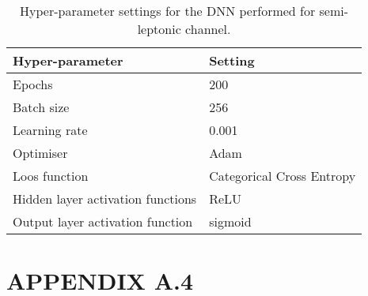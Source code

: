 \begin{table}[h!]
    \centering
    \caption{Hyper-parameter settings for the DNN performed for semi-leptonic channel.}
    \begin{tabular}{ l l }
    \hline
    Hyper-parameter & Setting \\
    \hline
    Epochs & 200 \\
    Batch size & 256 \\
    Learning rate & 0.001 \\
    Optimiser & Adam \\
    Loos function & Categorical Cross Entropy \\
    Hidden layer activation functions & ReLU \\
    Output layer activation function & sigmoid \\
    \hline
    \end{tabular}
    \label{hasOneL_dnnpars}
\end{table}
\newpage


\section*{APPENDIX A.4}

